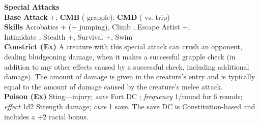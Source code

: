 \textbf{Special Attacks} \specialattacks \\
\textbf{Base Attack} +\baseattack; \textbf{CMB} \enhancedstat{+\allycmb} \hspace{1pt} (\enhancedstat{+\allygrapplecmb} \hspace{1pt} grapple); \textbf{CMD} \enhancedstat{\allycmd} \hspace{1pt} (\enhancedstat{\allytripcmd} \hspace{1pt} vs. trip) \\ 
\textbf{Skills} Acrobatics +\acrobaticsskill \hspace{1pt} (+\jumpskill \hspace{1pt} jumping), Climb \enhancedstat{+\climbskill}, Escape Artist +\escapeartistskill, \\ Intimidate \intimidateskill, Stealth +\stealthskill, Survival +\survivalskill, Swim \enhancedstat{+\swimskill} \\

\textbf{Constrict (Ex)} A creature with this special attack can crush an opponent, dealing bludgeoning damage, when it makes a successful grapple check (in addition to any other effects caused by a successful check, including additional damage). The amount of damage is given in the creature's entry and is typically equal to the amount of damage caused by the creature's melee attack. \\ 

\textbf{Poison (Ex)} Sting---injury; \textit{save} Fort DC ; \textit{frequency} 1/round for 6 rounds; \textit{effect} 1d2 Strength damage; \textit{cure} 1 save. The save DC is Constitution-based and includes a +2 racial bonus.

\newpage
